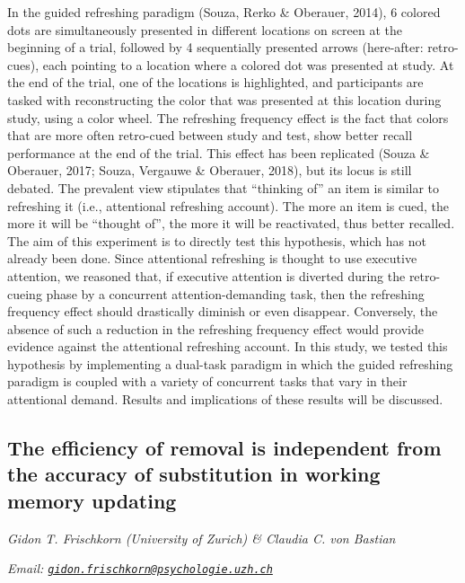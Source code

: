 \documentclass[
  12pt,
]{book}
\begin{document}
In the guided refreshing paradigm (Souza, Rerko \& Oberauer, 2014), 6 colored dots are simultaneously presented in different locations on screen at the beginning of a trial, followed by 4 sequentially presented arrows (here-after: retro-cues), each pointing to a location where a colored dot was presented at study. At the end of the trial, one of the locations is highlighted, and participants are tasked with reconstructing the color that was presented at this location during study, using a color wheel. The refreshing frequency effect is the fact that colors that are more often retro-cued between study and test, show better recall performance at the end of the trial. This effect has been replicated (Souza \& Oberauer, 2017; Souza, Vergauwe \& Oberauer, 2018), but its locus is still debated. The prevalent view stipulates that ``thinking of'' an item is similar to refreshing it (i.e., attentional refreshing account). The more an item is cued, the more it will be ``thought of'', the more it will be reactivated, thus better recalled. The aim of this experiment is to directly test this hypothesis, which has not already been done. Since attentional refreshing is thought to use executive attention, we reasoned that, if executive attention is diverted during the retro-cueing phase by a concurrent attention-demanding task, then the refreshing frequency effect should drastically diminish or even disappear. Conversely, the absence of such a reduction in the refreshing frequency effect would provide evidence against the attentional refreshing account. In this study, we tested this hypothesis by implementing a dual-task paradigm in which the guided refreshing paradigm is coupled with a variety of concurrent tasks that vary in their attentional demand. Results and implications of these results will be discussed.

\hypertarget{the-efficiency-of-removal-is-independent-from-the-accuracy-of-substitution-in-working-memory-updating}{%
\subsection{The efficiency of removal is independent from the accuracy of substitution in working memory updating}\label{the-efficiency-of-removal-is-independent-from-the-accuracy-of-substitution-in-working-memory-updating}}

\emph{Gidon T. Frischkorn (University of Zurich) \& Claudia C. von Bastian}

\emph{Email: \href{mailto:gidon.frischkorn@psychologie.uzh.ch}{\nolinkurl{gidon.frischkorn@psychologie.uzh.ch}}}
\end{document}
